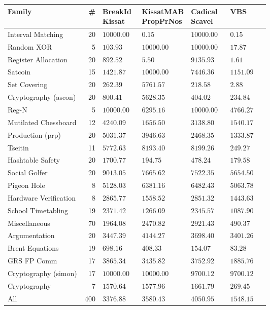 \begin{tabular}{lr|>{\raggedleft\arraybackslash}p{0.15\linewidth}>{\raggedleft\arraybackslash}p{0.15\linewidth}>{\raggedleft\arraybackslash}p{0.15\linewidth}|>{\raggedleft\arraybackslash}p{0.15\linewidth}}
\toprule
Family & \# & BreakId Kissat & KissatMAB PropPrNos & Cadical Scavel & VBS \\
\midrule
Interval Matching & 20 & $10000.00$ & \bfseries $0.15$ & $10000.00$ & $0.15$ \\
Random XOR & 5 & \bfseries $103.93$ & $10000.00$ & $10000.00$ & $17.87$ \\
Register Allocation & 20 & $892.52$ & \bfseries $5.50$ & $9135.93$ & $1.61$ \\
Satcoin & 15 & \bfseries $1421.87$ & $10000.00$ & $7446.36$ & $1151.09$ \\
Set Covering & 20 & $262.39$ & $5761.57$ & \bfseries $218.58$ & $2.88$ \\
Cryptography (ascon) & 20 & $800.41$ & $5628.35$ & \bfseries $404.02$ & $234.84$ \\
Reg-N & 5 & $10000.00$ & \bfseries $6295.16$ & $10000.00$ & $4766.27$ \\
Mutilated Chessboard & 12 & $4240.09$ & \bfseries $1656.50$ & $3138.80$ & $1540.17$ \\
Production (prp) & 20 & $5031.37$ & $3946.63$ & \bfseries $2468.35$ & $1333.87$ \\
Tseitin & 11 & \bfseries $5772.63$ & $8193.40$ & $8199.26$ & $249.27$ \\
Hashtable Safety & 20 & $1700.77$ & \bfseries $194.75$ & $478.24$ & $179.58$ \\
Social Golfer & 20 & $9013.05$ & $7665.62$ & \bfseries $7522.35$ & $5654.50$ \\
Pigeon Hole & 8 & \bfseries $5128.03$ & $6381.16$ & $6482.43$ & $5063.78$ \\
Hardware Verification & 8 & $2865.77$ & \bfseries $1558.52$ & $2851.32$ & $1443.63$ \\
School Timetabling & 19 & $2371.42$ & \bfseries $1266.09$ & $2345.57$ & $1087.90$ \\
Miscellaneous & 70 & \bfseries $1964.08$ & $2470.82$ & $2921.43$ & $490.37$ \\
Argumentation & 20 & \bfseries $3447.39$ & $4144.27$ & $3698.40$ & $3401.26$ \\
Brent Equations & 19 & $698.16$ & $408.33$ & \bfseries $154.07$ & $83.28$ \\
GRS FP Comm & 17 & $3865.34$ & \bfseries $3435.82$ & $3752.92$ & $1885.76$ \\
Cryptography (simon) & 17 & $10000.00$ & $10000.00$ & \bfseries $9700.12$ & $9700.12$ \\
Cryptography & 7 & \bfseries $1570.64$ & $1577.96$ & $1661.79$ & $269.45$ \\
\hline All & 400 & \bfseries $3376.88$ & $3580.43$ & $4050.95$ & $1548.15$ \\
\bottomrule
\end{tabular}
